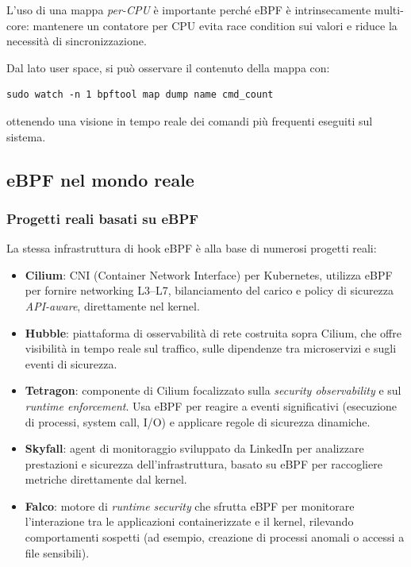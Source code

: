 L’uso di una mappa \emph{per-CPU} è importante perché eBPF è intrinsecamente
multi-core: mantenere un contatore per CPU evita race condition sui valori e
riduce la necessità di sincronizzazione.

Dal lato user space, si può osservare il contenuto della mappa con:

\begin{verbatim}
sudo watch -n 1 bpftool map dump name cmd_count
\end{verbatim}

ottenendo una visione in tempo reale dei comandi più frequenti eseguiti sul
sistema.


\subsection{eBPF nel mondo reale}

\subsubsection{Progetti reali basati su eBPF}

La stessa infrastruttura di hook eBPF è alla base di numerosi progetti reali:

\begin{itemize}
  \item \textbf{Cilium}: CNI (Container Network Interface) per Kubernetes,
        utilizza eBPF per fornire networking L3--L7, bilanciamento del carico
        e policy di sicurezza \emph{API-aware}, direttamente nel kernel.

  \item \textbf{Hubble}: piattaforma di osservabilità di rete costruita sopra Cilium,
        che offre visibilità in tempo reale sul traffico, sulle dipendenze tra
        microservizi e sugli eventi di sicurezza.

  \item \textbf{Tetragon}: componente di Cilium focalizzato sulla
        \emph{security observability} e sul \emph{runtime enforcement}. Usa
        eBPF per reagire a eventi significativi (esecuzione di processi,
        system call, I/O) e applicare regole di sicurezza dinamiche.

  \item \textbf{Skyfall}: agent di monitoraggio sviluppato da LinkedIn per
        analizzare prestazioni e sicurezza dell’infrastruttura, basato su eBPF
        per raccogliere metriche direttamente dal kernel.

  \item \textbf{Falco}: motore di \emph{runtime security} che sfrutta eBPF
        per monitorare l’interazione tra le applicazioni containerizzate e
        il kernel, rilevando comportamenti sospetti (ad esempio, creazione
        di processi anomali o accessi a file sensibili).
\end{itemize}

